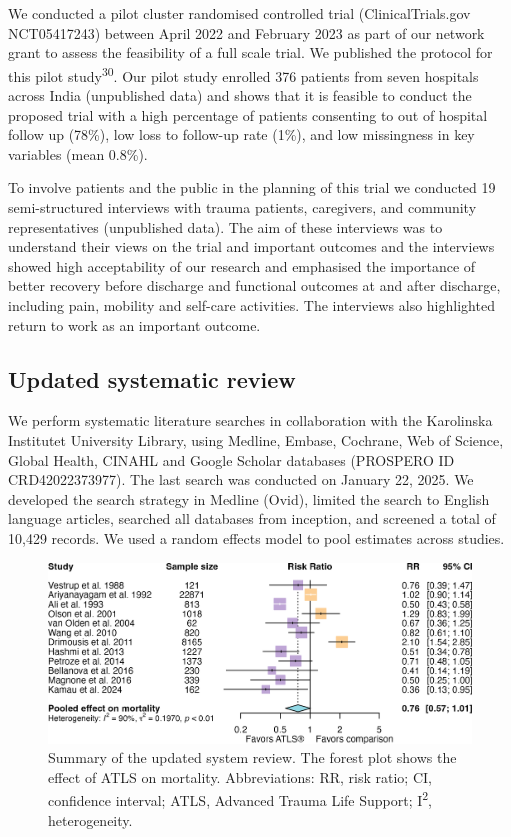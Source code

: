 \documentclass[
]{scrartcl}
\begin{document}
We conducted a pilot cluster randomised controlled trial
(ClinicalTrials.gov NCT05417243) between April 2022 and February 2023 as
part of our network grant to assess the feasibility of a full scale
trial. We published the protocol for this pilot
study\textsuperscript{30}. Our pilot study enrolled 376 patients from
seven hospitals across India (unpublished data) and shows that it is
feasible to conduct the proposed trial with a high percentage of
patients consenting to out of hospital follow up (78\%), low loss to
follow-up rate (1\%), and low missingness in key variables (mean 0.8\%).

To involve patients and the public in the planning of this trial we
conducted 19 semi-structured interviews with trauma patients,
caregivers, and community representatives (unpublished data). The aim of
these interviews was to understand their views on the trial and
important outcomes and the interviews showed high acceptability of our
research and emphasised the importance of better recovery before
discharge and functional outcomes at and after discharge, including
pain, mobility and self-care activities. The interviews also highlighted
return to work as an important outcome.

\hypertarget{updated-systematic-review}{%
\subsection{Updated systematic review}\label{updated-systematic-review}}

We perform systematic literature searches in collaboration with the
Karolinska Institutet University Library, using Medline, Embase,
Cochrane, Web of Science, Global Health, CINAHL and Google Scholar
databases (PROSPERO ID CRD42022373977). The last search was conducted on
January 22, 2025. We developed the search strategy in Medline (Ovid),
limited the search to English language articles, searched all databases
from inception, and screened a total of 10,429 records. We used a random
effects model to pool estimates across studies.

\begin{figure}

{\centering \includegraphics[width=5.81in,height=\textheight]{forest-plot.png}

}

\caption{\label{fig-forest-plot}Summary of the updated system review.
The forest plot shows the effect of ATLS on mortality. Abbreviations:
RR, risk ratio; CI, confidence interval; ATLS, Advanced Trauma Life
Support; I\textsuperscript{2}, heterogeneity.}

\end{figure}
\end{document}
